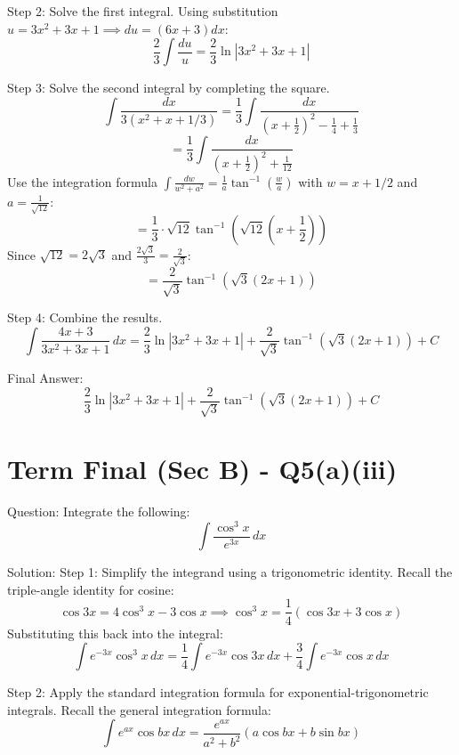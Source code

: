 \documentclass{article}
\begin{document}
Step 2: Solve the first integral.
Using substitution \(u = 3x^2 + 3x + 1 \implies du = (6x+3)dx\):
\[
\frac{2}{3} \int \frac{du}{u} = \frac{2}{3} \ln|3x^2 + 3x + 1|
\]

Step 3: Solve the second integral by completing the square.
\[
\int \frac{dx}{3(x^2 + x + 1/3)} = \frac{1}{3} \int \frac{dx}{\left(x + \frac{1}{2}\right)^2 - \frac{1}{4} + \frac{1}{3}}
\]
\[
= \frac{1}{3} \int \frac{dx}{\left(x + \frac{1}{2}\right)^2 + \frac{1}{12}}
\]
Use the integration formula \(\int \frac{dw}{w^2 + a^2} = \frac{1}{a} \tan^{-1}\left(\frac{w}{a}\right)\) with \(w = x + 1/2\) and \(a = \frac{1}{\sqrt{12}}\):
\[
= \frac{1}{3} \cdot \sqrt{12} \tan^{-1}\left( \sqrt{12} \left(x + \frac{1}{2}\right) \right)
\]
Since \(\sqrt{12} = 2\sqrt{3}\) and \(\frac{2\sqrt{3}}{3} = \frac{2}{\sqrt{3}}\):
\[
= \frac{2}{\sqrt{3}} \tan^{-1}\left( \sqrt{3}(2x + 1) \right)
\]

Step 4: Combine the results.
\[
\int \frac{4x+3}{3x^2+3x+1} \, dx = \frac{2}{3} \ln|3x^2+3x+1| + \frac{2}{\sqrt{3}} \tan^{-1}\left(\sqrt{3}(2x+1)\right) + C
\]

Final Answer:
\[
\boxed{\frac{2}{3} \ln|3x^2+3x+1| + \frac{2}{\sqrt{3}} \tan^{-1}\left(\sqrt{3}(2x+1)\right) + C}
\]

\section*{Term Final (Sec B) - Q5(a)(iii)}
Question:
Integrate the following:
\[
\int \frac{\cos^3 x}{e^{3x}} \, dx
\]

Solution:
Step 1: Simplify the integrand using a trigonometric identity.
Recall the triple-angle identity for cosine:
\[
\cos 3x = 4\cos^3 x - 3\cos x \implies \cos^3 x = \frac{1}{4}(\cos 3x + 3\cos x)
\]
Substituting this back into the integral:
\[
\int e^{-3x} \cos^3 x \, dx = \frac{1}{4} \int e^{-3x} \cos 3x \, dx + \frac{3}{4} \int e^{-3x} \cos x \, dx
\]

Step 2: Apply the standard integration formula for exponential-trigonometric integrals.
Recall the general integration formula:
\[
\int e^{ax} \cos bx \, dx = \frac{e^{ax}}{a^2 + b^2} (a \cos bx + b \sin bx)
\]
\end{document}

